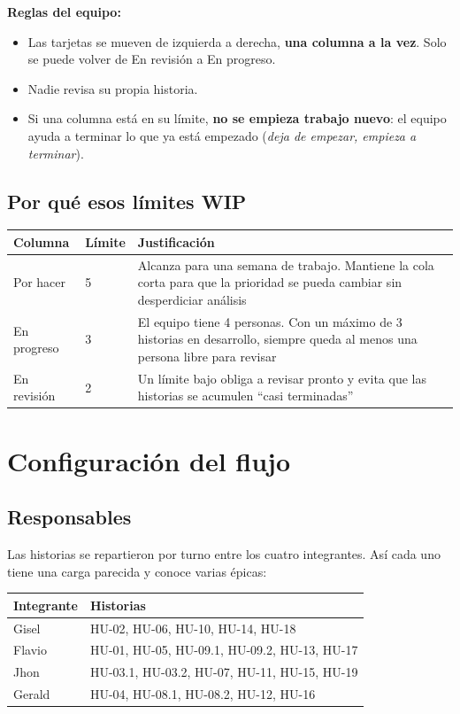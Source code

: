 \documentclass[11pt,a4paper]{article}
\begin{document}
\textbf{Reglas del equipo:}
\begin{itemize}
  \item Las tarjetas se mueven de izquierda a derecha, \textbf{una columna a la vez}. Solo se puede volver de En revisión a En progreso.
  \item Nadie revisa su propia historia.
  \item Si una columna está en su límite, \textbf{no se empieza trabajo nuevo}: el equipo ayuda a terminar lo que ya está empezado (\textit{deja de empezar, empieza a terminar}).
\end{itemize}

\subsection{Por qué esos límites WIP}

\begin{center}
\small
\begin{tabularx}{\linewidth}{L{2.4cm} C{1.4cm} Y}
\toprule
\textbf{Columna} & \textbf{Límite} & \textbf{Justificación} \\
\midrule
Por hacer & 5 & Alcanza para una semana de trabajo. Mantiene la cola corta para que la prioridad se pueda cambiar sin desperdiciar análisis \\
En progreso & 3 & El equipo tiene 4 personas. Con un máximo de 3 historias en desarrollo, siempre queda al menos una persona libre para revisar \\
En revisión & 2 & Un límite bajo obliga a revisar pronto y evita que las historias se acumulen ``casi terminadas'' \\
\bottomrule
\end{tabularx}
\end{center}

\section{Configuración del flujo}

\subsection{Responsables}

Las historias se repartieron por turno entre los cuatro integrantes. Así cada uno tiene una carga parecida y conoce varias épicas:

\begin{center}
\small
\begin{tabular}{L{2.4cm} L{10cm}}
\toprule
\textbf{Integrante} & \textbf{Historias} \\
\midrule
Gisel & HU-02, HU-06, HU-10, HU-14, HU-18 \\
Flavio & HU-01, HU-05, HU-09.1, HU-09.2, HU-13, HU-17 \\
Jhon & HU-03.1, HU-03.2, HU-07, HU-11, HU-15, HU-19 \\
Gerald & HU-04, HU-08.1, HU-08.2, HU-12, HU-16 \\
\bottomrule
\end{tabular}
\end{center}
\end{document}
